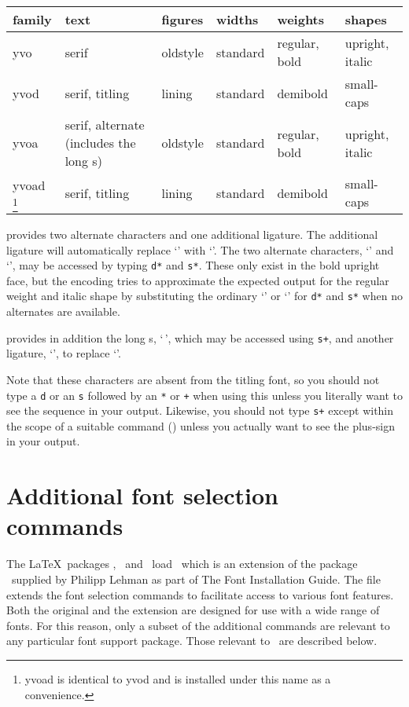 \documentclass[11pt,british]{article}
\begin{document}
	\begin{longtable}{l>{\raggedright}p{}l>{\raggedright}p{}>{\raggedright}p{}>{\raggedright}p{}}
		\toprule
		\textbf{family}	&	\textbf{text}	& \textbf{figures}	&	\textbf{widths}	&	\textbf{weights}	&	 \textbf{shapes}\tabularnewline\midrule\endhead
		\bottomrule\endfoot
		yvo		&	serif															&	oldstyle		&	standard	&	regular, bold		&	upright, italic\tabularnewline\midrule
		yvod	&	serif, titling												& lining			&	standard	&	demibold			&	small-caps\tabularnewline\midrule
		yvoa	&	serif, alternate (includes the long s)	&	oldstyle		&	standard	&	regular, bold		&	upright, italic\tabularnewline\midrule
		yvoad%
			\footnote{yvoad is identical to yvod and is installed under this name as a convenience.}%
					&	serif, titling												& lining			&	standard	&	demibold			&	small-caps\tabularnewline
	\end{longtable}
	
	 provides two alternate characters and one additional ligature. The additional ligature will automatically replace `' with `'. The two alternate characters, `' and `', may be accessed by typing \verb|d*| and \verb|s*|. These only exist in the bold upright face, but the encoding tries to approximate the expected output for the regular weight and italic shape by substituting the ordinary `' or `' for \verb|d*| and \verb|s*| when no alternates are available.
	
	 provides in addition the long s, `\,', which may be accessed using \verb|s+|, and another ligature, `', to replace `'.
	
	Note that these characters are absent from the titling font, so you should not type a \verb|d| or an \verb|s| followed by an \verb|*| or \verb|+| when using this unless you literally want to see the sequence in your output. Likewise, you should not type \verb|s+| except within the scope of a suitable command () unless you actually want to see the plus-sign in your output.
	
\section{Additional font selection commands}\label{sec:commands}

	The \LaTeX\ packages , \ and \ load \ which is an extension of the package \ supplied by Philipp Lehman as part of The Font Installation Guide. The file extends the font selection commands to facilitate access to various font features. Both the original and the extension are designed for use with a wide range of fonts. For this reason, only a subset of the additional commands are relevant to any particular font support package. Those relevant to \ are described below.
	
\end{document}
